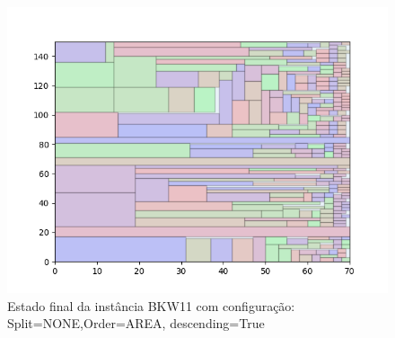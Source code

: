 \begin{figure}[H]
    \centering
    \caption[]{Estado final da instância BKW11 com configuração: Split=NONE,Order=AREA, descending=True}
    \label{fig:bkw11-none-area-true}
    \includegraphics[scale=0.5]{output/figures/bkw/bkw11/none/area/true/000}
\end{figure}